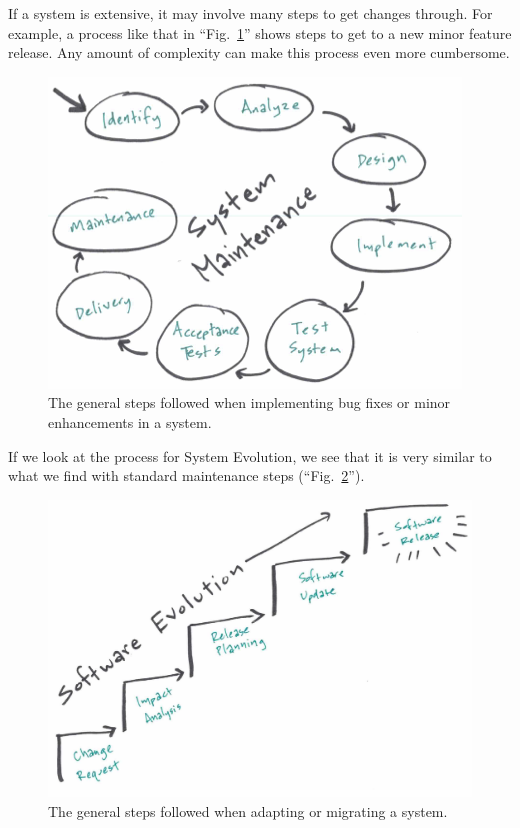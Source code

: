 \documentclass[12pt,conference]{IEEEtran}
\begin{document}
If a system is extensive, it may involve many steps to get changes through. For example, a process like that in ``Fig.~\ref{figSystemMaintenance}'' shows steps to get to a new minor feature release. Any amount of complexity can make this process even more cumbersome.

\begin{figure}[ht]
    \centerline{
        \includegraphics[width=0.8\columnwidth]{Maintenance}
    }
    \caption{The general steps followed when implementing bug fixes or minor enhancements in a system.}
    \label{figSystemMaintenance}
\end{figure}

If we look at the process for System Evolution, we see that it is very similar to what we find with standard maintenance steps (``Fig.~\ref{figSystemEvolution}'').

\begin{figure}[ht]
    \centerline{
        \includegraphics[width=0.8\columnwidth]{Evolution}
    }
    \caption{The general steps followed when adapting or migrating a system.}
    \label{figSystemEvolution}
\end{figure}
\end{document}
